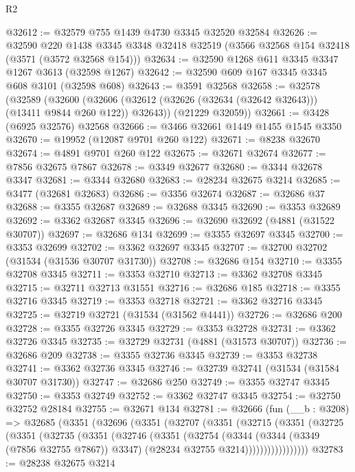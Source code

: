 \begin{lexlean}{R2}
\begin{coremodule}
@32612 := @32579 @755 @1439 @4730 @3345 @32520 @32584
@32626 := @32590
    @220
    @1438
    @3345
    @3348
    @32418
    @32519
    (@3566 @32568 @154 @32418 (@3571 (@3572 @32568 @154)))
@32634 := @32590 @1268 @611 @3345 @3347 @1267 @3613 (@32598 @1267)
@32642 := @32590 @609 @167 @3345 @3345 @608 @3101 (@32598 @608)
@32643 := @3591 @32568
@32658 := @32578
    (@32589
      (@32600 (@32606 (@32612 (@32626 (@32634 (@32642 @32643))) (@13411 @9844 @260 @122)) @32643))
      (@21229 @32059))
@32661 := @3428 (@6925 @32576) @32568
@32666 := @3466 @32661 @1449 @1455 @1545 @3350
@32670 := @19952 (@12087 @9701 @260 @122)
@32671 := @8238 @32670
@32674 := @4891 @9701 @260 @122
@32675 := @32671 @32674
@32677 := @7856 @32675 @7867
@32678 := @3349 @32677
@32680 := @3344 @32678 @3347
@32681 := @3344 @32680
@32683 := @28234 @32675 @3214
@32685 := @3477 (@32681 @32683)
@32686 := @3356 @32674
@32687 := @32686 @37
@32688 := @3355 @32687
@32689 := @32688 @3345
@32690 := @3353 @32689
@32692 := @3362 @32687 @3345
@32696 := @32690 @32692 (@4881 (@31522 @30707))
@32697 := @32686 @134
@32699 := @3355 @32697 @3345
@32700 := @3353 @32699
@32702 := @3362 @32697 @3345
@32707 := @32700 @32702 (@31534 (@31536 @30707 @31730))
@32708 := @32686 @154
@32710 := @3355 @32708 @3345
@32711 := @3353 @32710
@32713 := @3362 @32708 @3345
@32715 := @32711 @32713 @31551
@32716 := @32686 @185
@32718 := @3355 @32716 @3345
@32719 := @3353 @32718
@32721 := @3362 @32716 @3345
@32725 := @32719 @32721 (@31534 (@31562 @4441))
@32726 := @32686 @200
@32728 := @3355 @32726 @3345
@32729 := @3353 @32728
@32731 := @3362 @32726 @3345
@32735 := @32729 @32731 (@4881 (@31573 @30707))
@32736 := @32686 @209
@32738 := @3355 @32736 @3345
@32739 := @3353 @32738
@32741 := @3362 @32736 @3345
@32746 := @32739 @32741 (@31534 (@31584 @30707 @31730))
@32747 := @32686 @250
@32749 := @3355 @32747 @3345
@32750 := @3353 @32749
@32752 := @3362 @32747 @3345
@32754 := @32750 @32752 @28184
@32755 := @32671 @134
@32781 := @32666
    (fun (__b : @3208) =>
    @32685
      (@3351
        (@32696
          (@3351
            (@32707
              (@3351
                (@32715
                  (@3351
                    (@32725
                      (@3351
                        (@32735
                          (@3351
                            (@32746
                              (@3351
                                (@32754
                                  (@3344
                                    (@3344 (@3349 (@7856 @32755 @7867)) @3347)
                                    (@28234 @32755 @3214)))))))))))))))))
@32783 := @28238 @32675 @3214

\end{coremodule}
\end{lexlean}
